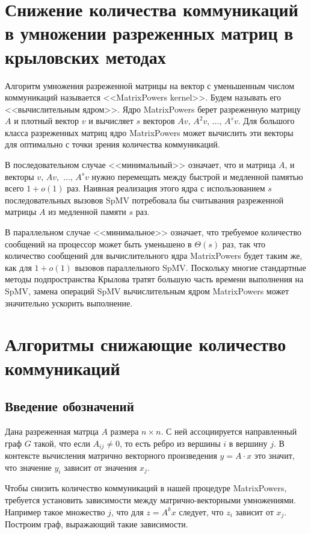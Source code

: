 \documentclass[a4paper,12pt]{report}
\begin{document}
    \chapter{ Снижение количества коммуникаций в умножении разреженных матриц в крыловских методах}
    Алгоритм умножения разреженной матрицы на вектор с уменьшенным числом коммуникаций называется <<MatrixPowers kernel>>. Будем называть его <<вычислительным ядром>>. Ядро MatrixPowers берет разреженную матрицу $A$ и плотный вектор $v$ и вычисляет $s$ векторов $Av,\, A^2v,\, \ldots,\, A^s v$. Для большого класса разреженных матриц ядро MatrixPowers может вычислить эти векторы для оптимально с точки зрения количества коммуникаций.
    
    В последовательном случае <<минимальный>> означает, что и матрица $A$, и векторы $v,\, Av,$ $\ldots,\, A^sv$ нужно перемещать между быстрой и медленной памятью всего $1 + o(1)$ раз. Наивная реализация этого ядра с использованием $s$ последовательных вызовов SpMV потребовала бы считывания разреженной матрицы $A$ из медленной памяти $s$ раз. 
    
    В параллельном случае <<минимальное>> означает, что требуемое количество сообщений на процессор может быть уменьшено в $\Theta(s)$ раз, так что количество сообщений для вычислительного ядра MatrixPowers будет таким же, как для $1 + o(1)$ вызовов параллельного SpMV. Поскольку многие стандартные методы подпространства Крылова тратят большую часть времени выполнения на SpMV, замена операций SpMV вычислительным ядром MatrixPowers может значительно ускорить выполнение.

    \chapter{ Алгоритмы снижающие количество коммуникаций }

    \section{ Введение обозначений }

    Дана разреженная матрца $A$ размера $n \times n$. С ней ассоциируется направленный граф $G$ такой, что если $A_{ij} \ne 0$, то есть ребро из вершины $i$ в вершину $j$. В контексте вычисления матрично векторного произведения $y = A \cdot x$ это значит, что значение $y_i$ зависит от значения $x_j$.

    Чтобы снизить количество коммуникаций в нашей процедуре MatrixPowers, требуется установить зависимости между матрично-векторными умножениями. Например такое множество $j$, что для $z = A^k x$ следует, что $z_i$ зависит от $x_j$. Построим граф, выражающий такие зависимости.
\end{document}
